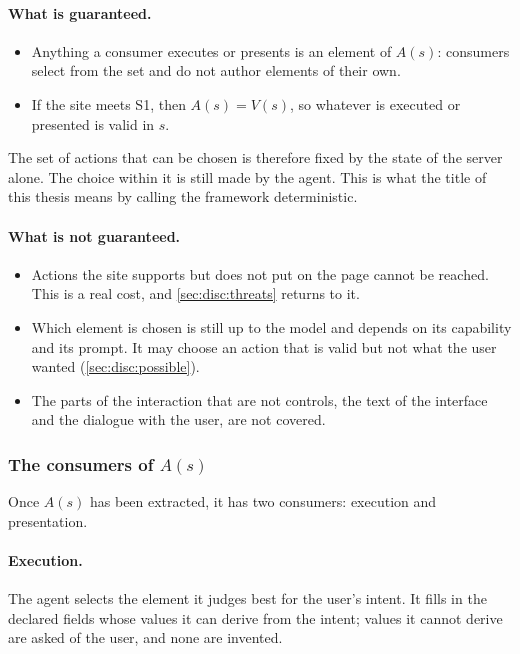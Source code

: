 \paragraph{What is guaranteed.}
\begin{itemize}
    \item Anything a consumer executes or presents is an element of $A(s)$: consumers select from the set and do not author elements of their own.
    \item If the site meets S1, then $A(s) = V(s)$, so whatever is executed or presented is valid in $s$.
\end{itemize}
The set of actions that can be chosen is therefore fixed by the state of the server alone.
The choice within it is still made by the agent.
This is what the title of this thesis means by calling the framework deterministic.

\paragraph{What is not guaranteed.}
\begin{itemize}
    \item Actions the site supports but does not put on the page cannot be reached. This is a real cost, and \autoref{sec:disc:threats} returns to it.
    \item Which element is chosen is still up to the model and depends on its capability and its prompt. It may choose an action that is valid but not what the user wanted (\autoref{sec:disc:possible}).
    \item The parts of the interaction that are not controls, the text of the interface and the dialogue with the user, are not covered.
\end{itemize}

\subsubsection{The consumers of \texorpdfstring{$A(s)$}{A(s)}}\label{sec:design:consumers}

Once $A(s)$ has been extracted, it has two consumers: execution and presentation.

\paragraph{Execution.}
The agent selects the element it judges best for the user's intent.
It fills in the declared fields whose values it can derive from the intent; values it cannot derive are asked of the user, and none are invented.

